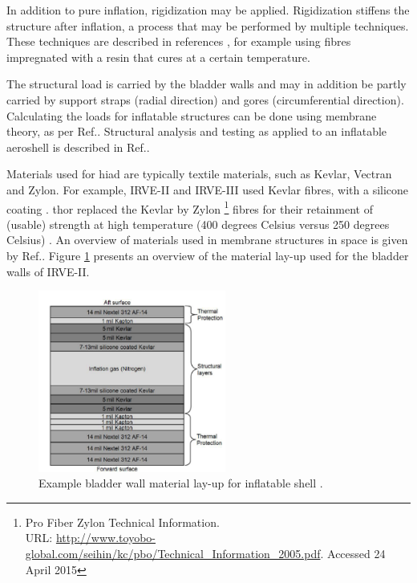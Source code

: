 In addition to pure inflation, rigidization may be applied. Rigidization stiffens the structure after inflation, a process that may be performed by multiple techniques. These techniques are described in references \cite{Freeland1998,Jenkins2001}, for example using fibres impregnated with a resin that cures at a certain temperature. 

The structural load is carried by the bladder walls and may in addition be partly carried by support straps (radial direction) and gores (circumferential direction). Calculating the loads for inflatable structures can be done using membrane theory, as per Ref.\cite{Young2002}. Structural analysis and testing as applied to an inflatable aeroshell is described in Ref.\cite{Lindell2006}.

Materials used for \gls{hiad} are typically textile materials, such as Kevlar, Vectran and Zylon. For example, IRVE-II and IRVE-III used Kevlar fibres, with a silicone coating \cite{Dillman2012a}. \gls{thor} replaced the Kevlar by Zylon \footnote{Pro Fiber Zylon Technical Information. \\ URL: \url{http://www.toyobo-global.com/seihin/kc/pbo/Technical\_Information\_2005.pdf}. Accessed 24 April 2015} fibres for their retainment of (usable) strength at high temperature (400 degrees Celsius versus 250 degrees Celsius) \cite{Dillman2014}. An overview of materials used in membrane structures in space is given by Ref.\cite{Jenkins2001}. Figure \ref{fig:matlayup} presents an overview of the material lay-up used for the bladder walls of IRVE-II.

\begin{figure}[H]
\centering
\includegraphics[width = 0.55\textwidth]{Figure/IRVE2_bladder_mat.PNG}
\caption{Example bladder wall material lay-up for inflatable shell \cite[p.2]{Dillman2010}.}
\label{fig:matlayup}
\end{figure}

